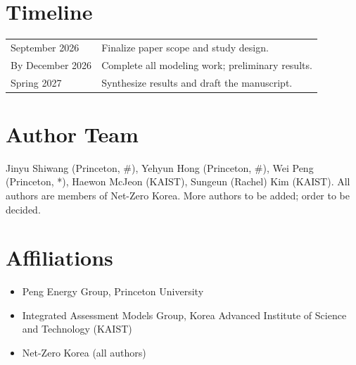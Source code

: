 
\section{Timeline}

\begin{center}
\begin{tabular}{ll}
\hline
September 2026   & Finalize paper scope and study design. \\
By December 2026 & Complete all modeling work; preliminary results. \\
Spring 2027      & Synthesize results and draft the manuscript. \\
\hline
\end{tabular}
\end{center}

\section{Author Team}

Jinyu Shiwang (Princeton, \#), Yehyun Hong (Princeton, \#), Wei Peng (Princeton, *),
Haewon McJeon (KAIST), Sungeun (Rachel) Kim (KAIST). All authors are members of Net-Zero Korea.
More authors to be added; order to be decided.

\section{Affiliations}

\begin{itemize}
  \item Peng Energy Group, Princeton University
  \item Integrated Assessment Models Group, Korea Advanced Institute of Science and Technology (KAIST)
  \item Net-Zero Korea (all authors)
\end{itemize}
